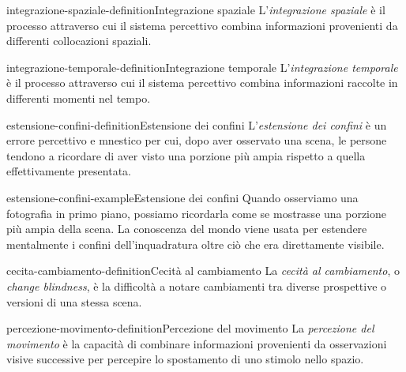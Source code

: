 \documentclass[preview]{standalone}
\begin{document}
\begin{snippetdefinition}{integrazione-spaziale-definition}{Integrazione spaziale}
    L'\emph{integrazione spaziale} è il processo attraverso cui il sistema
    percettivo combina informazioni provenienti da differenti collocazioni
    spaziali.
\end{snippetdefinition}

\begin{snippetdefinition}{integrazione-temporale-definition}{Integrazione temporale}
    L'\emph{integrazione temporale} è il processo attraverso cui il sistema
    percettivo combina informazioni raccolte in differenti momenti nel tempo.
\end{snippetdefinition}

\begin{snippetdefinition}{estensione-confini-definition}{Estensione dei confini}
    L'\emph{estensione dei confini} è un errore percettivo e mnestico per cui,
    dopo aver osservato una scena, le persone tendono a ricordare di aver visto
    una porzione più ampia rispetto a quella effettivamente presentata.
\end{snippetdefinition}

\begin{snippetexample}{estensione-confini-example}{Estensione dei confini}
    Quando osserviamo una fotografia in primo piano, possiamo ricordarla come
    se mostrasse una porzione più ampia della scena. La conoscenza del mondo
    viene usata per estendere mentalmente i confini dell'inquadratura oltre ciò
    che era direttamente visibile.
\end{snippetexample}


\begin{snippetdefinition}{cecita-cambiamento-definition}{Cecità al cambiamento}
    La \emph{cecità al cambiamento}, o \emph{change blindness}, è la difficoltà
    a notare cambiamenti tra diverse prospettive o versioni di una stessa
    scena.
\end{snippetdefinition}

\begin{snippetdefinition}{percezione-movimento-definition}{Percezione del movimento}
    La \emph{percezione del movimento} è la capacità di combinare informazioni
    provenienti da osservazioni visive successive per percepire lo spostamento
    di uno stimolo nello spazio.
\end{snippetdefinition}
\end{document}
